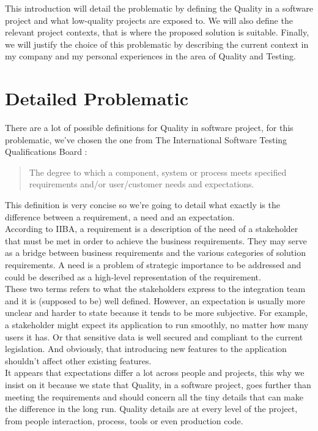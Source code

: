 This introduction will detail the problematic by defining the Quality in
a software project and what low-quality projects are exposed to.
We will also define the relevant project contexts, that is where the proposed
solution is suitable.
Finally, we will justify the choice of this problematic by describing the
current context in my company and my personal experiences in the area of
Quality and Testing.

\section{Detailed Problematic}\label{sec:detailed-problematic}

There are a lot of possible definitions for Quality in software project, for
this problematic, we've chosen the one from The International Software
Testing Qualifications Board :
\begin{quote}
The degree to which a component, system or process meets specified
requirements and/or user/customer needs and expectations.
\end{quote}
This definition is very concise so we're going to detail what exactly is the
difference between a requirement, a need and an expectation. \\
According to IIBA, a requirement is a description of the need of a
stakeholder that must be met in order to achieve the business requirements.
They may serve as a bridge between business requirements and the various
categories of solution requirements.
A need is a problem of strategic importance to be addressed and could be
described as a high-level representation of the requirement. \\
These two terms refers to what the stakeholders express to the integration
team and it is (supposed to be) well defined.
However, an expectation is usually more unclear and harder to state because
it tends to be more subjective.
For example, a stakeholder might expect its application to run smoothly, no
matter how many users it has.
Or that sensitive data is well secured and compliant to the current legislation.
And obviously, that introducing new features to the application shouldn't affect
other existing features. \\
It appears that expectations differ a lot across people and projects, this
why we insist on it because we state that Quality, in a software project, goes
further than meeting the requirements and should concern all the
tiny details that can make the difference in the long run.
Quality details are at every level of the project, from people interaction,
process, tools or even production code. \\
\newline



